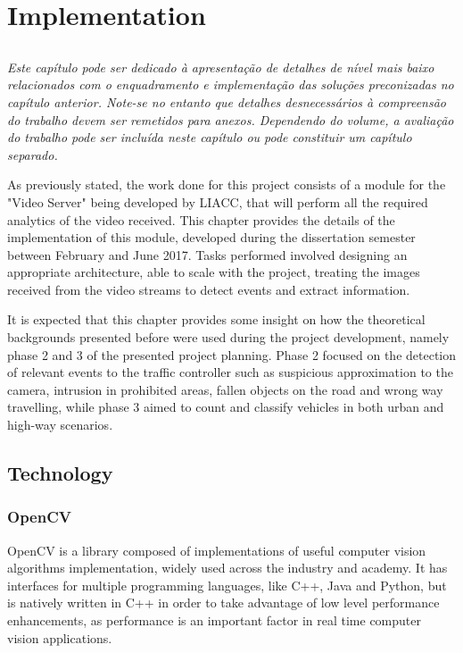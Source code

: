 
\chapter{Implementation}\label{chap:chap4}
\listoftodos
\section*{}

\textit{
Este capítulo pode ser dedicado à apresentação de detalhes de nível
mais baixo relacionados com o enquadramento e implementação das
soluções preconizadas no capítulo anterior.
Note-se no entanto que detalhes desnecessários à compreensão do
trabalho devem ser remetidos para anexos.
Dependendo do volume, a avaliação do trabalho pode ser incluída neste
capítulo ou pode constituir um capítulo separado.
}


As previously stated, the work done for this project consists of a module for the "Video Server" being developed by LIACC, that will perform all the required analytics of the video received. This chapter provides the details of the implementation of this module, developed during the dissertation semester between February and June 2017. Tasks performed involved designing an appropriate architecture, able to scale with the project, treating the images received from the video streams to detect events and extract information. 

It is expected that this chapter provides some insight on how the theoretical backgrounds presented before were used during the project development, namely phase 2 and 3 of the presented project planning. Phase 2 focused on the detection of relevant events to the traffic controller such as suspicious approximation to the camera, intrusion in prohibited areas, fallen objects on the road and wrong way travelling, while phase 3 aimed to count and classify vehicles in both urban and high-way scenarios.

\section{Technology}



\subsection{OpenCV}
OpenCV is a library composed of implementations of useful computer vision algorithms implementation, widely used across the industry and academy. It has interfaces for multiple programming languages, like C++, Java and Python, but is natively written in C++ in order to take advantage of low level performance enhancements, as performance is an important factor in real time computer vision applications.

